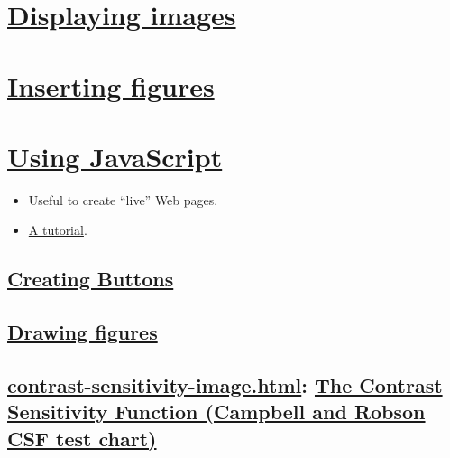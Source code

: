 

\chapter{\href{http://www.w3schools.com/tags/tag_img.asp}{Displaying images}}



\chapter{\href{http://www.w3schools.com/tags/tag_figure.asp}{Inserting figures}}



\chapter{\href{http://www.w3schools.com/html/html_scripts.asp}{Using JavaScript}}

\begin{itemize}
\item Useful to create ``live'' Web pages.
\item \href{http://www.w3schools.com/js}{A tutorial}.
\end{itemize}

\section{\href{http://www.w3schools.com/tags/tag_button.asp}{Creating Buttons}}



\section{\href{http://www.w3schools.com/tags/tag_canvas.asp}{Drawing figures}}



\section{\href{A more complex JavaScript demo}{contrast-sensitivity-image.html}: \href{http://en.wikipedia.org/wiki/Contrast_(vision)}{The Contrast Sensitivity Function (Campbell and Robson CSF test chart)}}

%
\ifx \HCode\Undfef%
\else%
\fi



